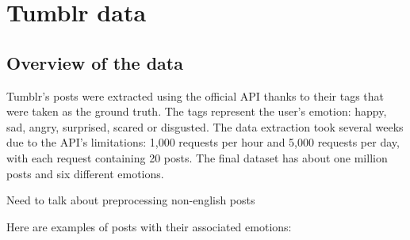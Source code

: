 \chapter{Tumblr data}

\section{Overview of the data}
Tumblr's posts were extracted using the official API thanks to their tags that were taken as the ground truth. The tags represent the user's emotion: happy, sad, angry, surprised, scared or disgusted. The data extraction took several weeks due to the API's limitations: 1,000 requests per hour and 5,000 requests per day, with each request containing 20 posts. The final dataset has about one million posts and six different emotions.

Need to talk about preprocessing non-english posts

Here are examples of posts with their associated emotions:


